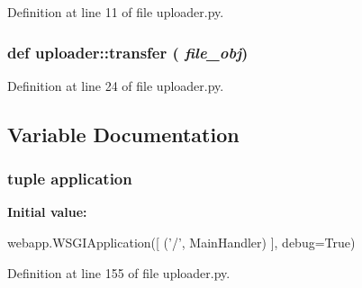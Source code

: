 Definition at line 11 of file uploader.py.\hypertarget{namespaceuploader_a118cbe977c15312bd15cb16999d48d8d}{
\subsubsection[{transfer}]{\setlength{\rightskip}{0pt plus 5cm}def uploader::transfer ( {\em file\_\-obj})}}
\label{namespaceuploader_a118cbe977c15312bd15cb16999d48d8d}


Definition at line 24 of file uploader.py.

\subsection{Variable Documentation}
\hypertarget{namespaceuploader_a84bbed69751228281d405bfe08a3cc1d}{
\subsubsection[{application}]{\setlength{\rightskip}{0pt plus 5cm}tuple {\bf application}}}
\label{namespaceuploader_a84bbed69751228281d405bfe08a3cc1d}
{\bfseries Initial value:}
\begin{DoxyCode}
webapp.WSGIApplication([
            ('/', MainHandler)
        ], debug=True)
\end{DoxyCode}


Definition at line 155 of file uploader.py.